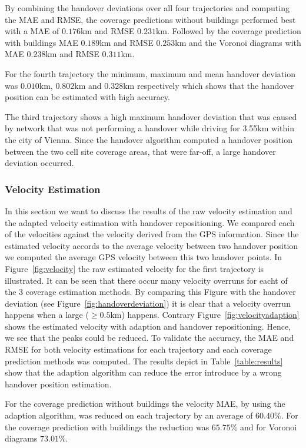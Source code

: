 \documentclass[twocolumn]{bmcart}%
\begin{document}
By combining the handover deviations over all four trajectories and computing the MAE and RMSE, the coverage predictions without buildings performed best with a MAE of $0.176$km and RMSE $0.231$km. Followed by the coverage prediction with buildings MAE $0.189$km and RMSE $0.253$km and the Voronoi diagrams with MAE $0.238$km and RMSE $0.311$km.

For the fourth trajectory the minimum, maximum and mean handover deviation was $0.010$km, $0.802$km and $0.328$km respectively which shows that the handover position can be estimated with high accuracy.

The third trajectory shows a high maximum handover deviation that was caused by network that was not performing a handover while driving for 3.55km within the city of Vienna. Since the handover algorithm computed a handover position between the two cell site coverage areas, that were far-off, a large handover deviation occurred.
\subsubsection*{Velocity Estimation}
In this section we want to discuss the results of the raw velocity estimation and the adapted velocity estimation with handover repositioning. We compared each of the velocities against the velocity derived from the GPS information. Since the estimated velocity accords to the average velocity between two handover position we computed the average GPS velocity between this two handover points. In Figure~\ref{fig:velocity} the raw estimated velocity for the first trajectory is illustrated. It can be seen that there occur many velocity overruns for eacht of the 3 coverage estimation methods. By comparing this Figure with the handover deviation (see Figure~\ref{fig:handoverdeviation}) it is clear that a velocity overrun happens when a large ($\ge0.5$km) happens. Contrary Figure~\ref{fig:velocityadaption} shows the estimated velocity with adaption and handover repositioning. Hence, we see that the peaks could be reduced. To validate the accuracy, the MAE and RMSE for both velocity estimations for each trajectory and each coverage prediction methods was computed. The results depict in Table~\ref{table:results} show that the adaption algorithm can reduce the error introduce by a wrong handover position estimation.

For the coverage prediction without buildings the velocity MAE, by using the adaption algorithm, was reduced on each trajectory by an average of $60.40\%$. For the coverage prediction with buildings the reduction was $65.75\%$ and for Voronoi diagrams $73.01\%$. 
\end{document}
